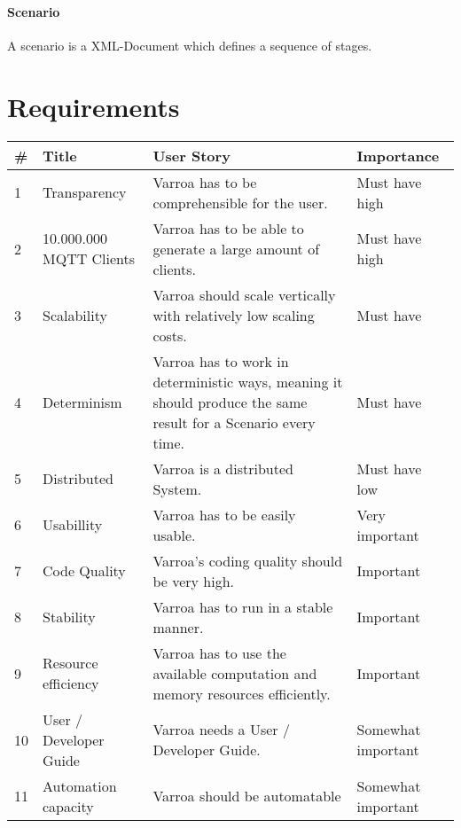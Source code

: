\paragraph{Scenario}
A scenario is a XML-Document which defines a sequence of stages.






\section{Requirements}
\begin{table}
	\begin{tabular}{| l | l | p{5cm} | l |}
		\hline
		\rowcolor{Gray}
		\# & Title & User Story & Importance \\
		\hline
		1 & Transparency & Varroa has to be comprehensible for the user. & Must have high \\
		\hline
		2 & 10.000.000 MQTT Clients & Varroa has to be able to generate a large amount of clients. & Must have high \\
		\hline
		3 & Scalability & Varroa should scale vertically with relatively low scaling costs. & Must have \\
		\hline
		4 & Determinism & Varroa has to work in deterministic ways, meaning it should produce the same result for a Scenario every time. & Must have \\
		\hline
		5 & Distributed & Varroa is a distributed System. & Must have low \\
		\hline
		6 & Usabillity & Varroa has to be easily usable. & Very important \\
		\hline
		7 & Code Quality & Varroa's coding quality should be very high. & Important\\
		\hline
		8 & Stability & Varroa has to run in a stable manner. & Important \\
		\hline
		9 & Resource efficiency & Varroa has to use the available computation and memory resources efficiently. & Important\\
		\hline
		10 & User / Developer Guide & Varroa needs a User / Developer Guide. & Somewhat important \\
		\hline
		11 & Automation capacity & Varroa should be automatable & Somewhat important \\
		\hline
	\end{tabular}
\end{table}